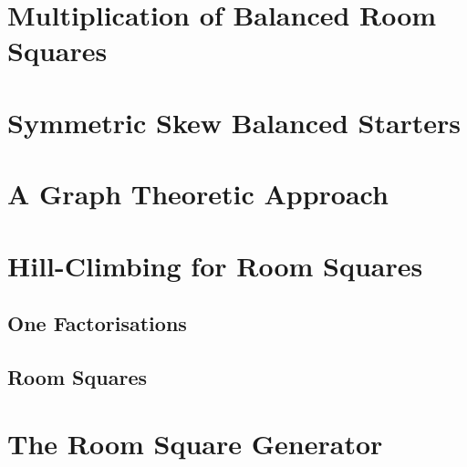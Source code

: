\documentclass[a4paper, draft]{book}
\begin{document}
\chapter{Multiplication of Balanced Room Squares}
  \label{ch:brs-multiplication}
  

\chapter{Symmetric Skew Balanced Starters}
  \label{ch:symmetric-skew-balanced-starters}
  

\chapter{A Graph Theoretic Approach}
  \label{ch:graph-theoretic}
  

\chapter{Hill-Climbing for Room Squares}
  \label{ch:hill-climbing}
  
  \section{One Factorisations}
  
  \section{Room Squares}
  

\appendix
\chapter{The Room Square Generator}
  \label{ch:room-square-generator}
  

\backmatter
\printbibliography[title=References]

\printindex
\end{document}
